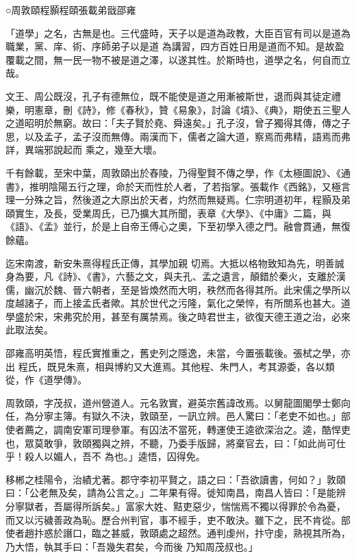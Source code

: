 
\begin{pinyinscope}

 ○周敦頤程顥程頤張載弟戩邵雍



 「道學」之名，古無是也。三代盛時，天子以是道為政教，大臣百官有司以是道為職業，黨、庠、術、序師弟子以是道
 為講習，四方百姓日用是道而不知。是故盈覆載之間，無一民一物不被是道之澤，以遂其性。於斯時也，道學之名，何自而立哉。



 文王、周公既沒，孔子有德無位，既不能使是道之用漸被斯世，退而與其徒定禮樂，明憲章，刪《詩》，修《春秋》，贊《易象》，討論《墳》、《典》，期使五三聖人之道昭明於無窮。故曰：「夫子賢於堯、舜遠矣。」孔子沒，曾子獨得其傳，傳之子思，以及孟子，孟子沒而無傳。兩漢而下，儒者之論大道，察焉而弗精，語焉而弗詳，異端邪說起而
 乘之，幾至大壞。



 千有餘載，至宋中葉，周敦頤出於舂陵，乃得聖賢不傳之學，作《太極圖說》、《通書》，推明陰陽五行之理，命於天而性於人者，了若指掌。張載作《西銘》，又極言理一分殊之旨，然後道之大原出於天者，灼然而無疑焉。仁宗明道初年，程顥及弟頤實生，及長，受業周氏，已乃擴大其所聞，表章《大學》、《中庸》二篇，與《語》、《孟》並行，於是上自帝王傅心之奧，下至初學入德之門。融會貫通，無復餘蘊。



 迄宋南渡，新安朱熹得程氏正傳，其學加親
 切焉。大抵以格物致知為先，明善誠身為要，凡《詩》、《書》，六藝之文，與夫孔、孟之遺言，顛錯於秦火，支離於漢儒，幽沉於魏、晉六朝者，至是皆煥然而大明，秩然而各得其所。此宋儒之學所以度越諸子，而上接孟氏者歟。其於世代之污隆，氣化之榮悴，有所關系也甚大。道學盛於宋，宋弗究於用，甚至有厲禁焉。後之時君世主，欲復天德王道之治，必來此取法矣。



 邵雍高明英悟，程氏實推重之，舊史列之隱逸，未當，今置張載後。張栻之學，亦出
 程氏，既見朱熹，相與博約又大進焉。其他程、朱門人，考其源委，各以類從，作《道學傳》。



 周敦頤，字茂叔，道州營道人。元名敦實，避英宗舊諱改焉。以舅龍圖閣學士鄭向任，為分寧主簿。有獄久不決，敦頤至，一訊立辨。邑人驚曰：「老吏不如也。」部使者薦之，調南安軍司理參軍。有囚法不當死，轉運使王逵欲深治之。逵，酷悍吏也，眾莫敢爭，敦頤獨與之辨，不聽，乃委手版歸，將棄官去，曰：「如此尚可仕乎！殺人以媚人，吾不
 為也。」逵悟，囚得免。



 移郴之桂陽令，治績尤著。郡守李初平賢之，語之曰：「吾欲讀書，何如？」敦頤曰：「公老無及矣，請為公言之。」二年果有得。徙知南昌，南昌人皆曰：「是能辨分寧獄者，吾屬得所訴矣。」富家大姓、黠吏惡少，惴惴焉不獨以得罪於令為憂，而又以污穢善政為恥。歷合州判官，事不經手，吏不敢決。雖下之，民不肯從。部使者趙抃惑於譖口，臨之甚威，敦頤處之超然。通判虔州，抃守虔，熟視其所為，乃大悟，執其手曰：「吾幾失君矣，今而後
 乃知周茂叔也。」




\end{pinyinscope}
